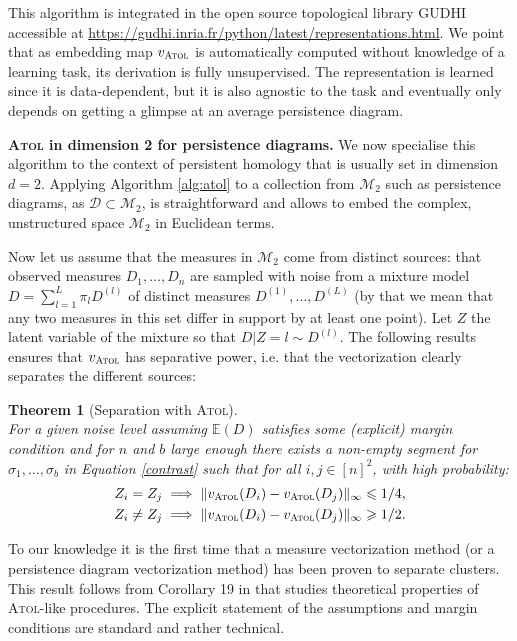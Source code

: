 \documentclass[twoside]{article}
\newtheorem{theorem}{Theorem}
\begin{document}
This algorithm is integrated in the open source topological library
GUDHI \cite{gudhi} accessible at \url{https://gudhi.inria.fr/python/latest/representations.html}.
We point that as embedding map $v_{\textsc{Atol}}$ is automatically computed without knowledge of a learning task, its derivation is fully unsupervised. The representation is learned since it is data-dependent, but it is also agnostic to the task and eventually only depends on getting a glimpse at an average persistence diagram.

\textbf{\textsc{Atol} in dimension 2 for persistence diagrams.}
We now specialise this algorithm to the context of persistent homology that is usually set in dimension $d = 2$. Applying Algorithm \ref{alg:atol} to a collection from $\mathcal{M}_2$ such as persistence diagrams, as $\mathcal{D} \subset \mathcal{M}_2$, is straightforward and allows to embed the complex, unstructured space $\mathcal{M}_2$ in Euclidean terms.

Now let us assume that the measures in $\mathcal{M}_2$ come from distinct sources: that observed measures $D_1, \dots, D_n$ are sampled with noise from a mixture model $D = \sum_{l=1}^{L} \pi_l D^{(l)}$ of distinct measures $D^{(1)}, \dots, D^{(L)}$ (by that we mean that any two measures in this set differ in support by at least one point). Let $Z$ the latent variable of the mixture so that $D|Z=l \sim D^{(l)}$. The following results ensures that $v_{\textsc{Atol}}$ has separative power, i.e. that the vectorization clearly separates the different sources:
\begin{theorem}[Separation with \textsc{Atol}]\ \\
	\label{thm:separation-atol}
	For a given noise level assuming $\mathbb{E}(D)$ satisfies some (explicit) margin condition and for $n$ and $b$ large enough there exists a non-empty segment for $\sigma_1, \dots, \sigma_b$ in Equation \eqref{contrast} such that for all $i, j \in [n]^2$, with high probability:
	\begin{align}
	Z_i = Z_j &\implies \Vert v_{\textsc{Atol}}(D_i) - v_{\textsc{Atol}}(D_j) \Vert_{\infty} \leqslant 1/4, \\
	Z_i \neq Z_j &\implies \Vert v_{\textsc{Atol}}(D_i) - v_{\textsc{Atol}}(D_j) \Vert_{\infty} \geqslant 1/2.
	\end{align}
\end{theorem}

To our knowledge it is the first time that a measure vectorization method (or a persistence diagram vectorization method) has been proven to separate clusters. This result follows from Corollary 19 in \cite{levrard20} that studies theoretical properties of \textsc{Atol}-like procedures. The explicit statement of the assumptions and margin conditions are standard and rather technical. 
\end{document}
